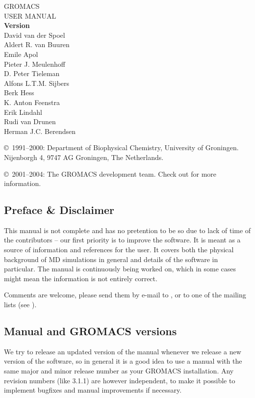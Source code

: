\documentclass[11pt,a4paper,twoside]{gmxmanual}
\begin{document}
\begin{center}
\phantom{ }
\vspace{1cm}
{\fontsize{40}{50} \selectfont 
GROMACS\\
USER MANUAL\\[1cm]
}
{\LARGE\bf Version \gmxver}\\[1cm]
{\Large 
David van der Spoel     \\
Aldert R. van Buuren    \\
Emile Apol              \\
Pieter J. Meulenhoff    \\
D. Peter Tieleman       \\
Alfons L.T.M. Sijbers   \\
Berk Hess               \\
K. Anton Feenstra       \\
Erik Lindahl            \\
Rudi van Drunen         \\
Herman J.C. Berendsen \\
}
\end{center}

\vfill


\noindent \copyright\ 1991--2000: 
Department of Biophysical Chemistry, University of Groningen. 
Nijenborgh 4, 9747 AG Groningen, The Netherlands.\\
\medskip

\noindent \copyright\ 2001--2004:
The GROMACS development team.
Check out \wwwpage for more information.


\newpage
\pagestyle{fancyplain}

\subsection*{Preface \& Disclaimer}
This manual is not complete and has no pretention to be so due
to lack of time of the contributors -- our first priority is to improve
the software. It is meant as a source of
information and references for the {\gromacs} user.  It covers both the
physical background of MD simulations in general and details of 
the {\gromacs} software in particular. The manual is 
continuously being worked on,
which in some cases might mean the information is not entirely correct.

Comments are welcome, please send them by e-mail to {\email}, or to
one of the mailing lists (see \wwwpage).

\subsection*{Manual and GROMACS versions}
We try to release an updated version of the manual whenever
we release a new version of the software, so in general 
it is a good idea to use a manual with the same major and
minor release number as your GROMACS installation. 
Any revision numbers (like 3.1.1) are however independent, 
to make it possible to implement bugfixes and manual
improvements if necessary. 
\end{document}
